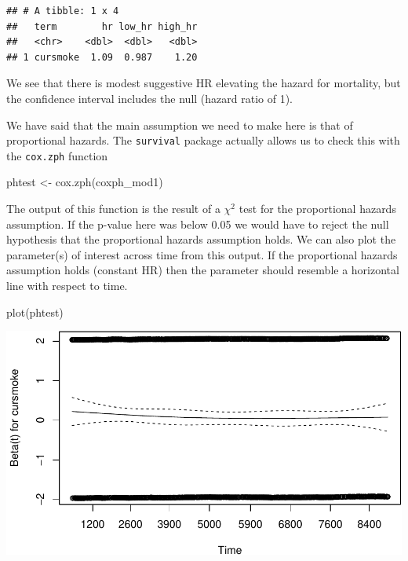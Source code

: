 \documentclass[
]{book}
\newenvironment{Shaded}{\begin{snugshade}}{\end{snugshade}}
\newcommand{\FunctionTok}[1]{\textcolor[rgb]{0.00,0.00,0.00}{#1}}
\newcommand{\NormalTok}[1]{#1}
\newcommand{\OtherTok}[1]{\textcolor[rgb]{0.56,0.35,0.01}{#1}}
\begin{document}
\begin{verbatim}
## # A tibble: 1 x 4
##   term        hr low_hr high_hr
##   <chr>    <dbl>  <dbl>   <dbl>
## 1 cursmoke  1.09  0.987    1.20
\end{verbatim}

We see that there is modest suggestive HR elevating the hazard for mortality, but the confidence interval includes the null (hazard ratio of 1).

We have said that the main assumption we need to make here is that of proportional hazards. The \texttt{survival} package actually allows us to check this with the \texttt{cox.zph} function

\begin{Shaded}
\begin{Highlighting}[]
\NormalTok{phtest }\OtherTok{\textless{}{-}} \FunctionTok{cox.zph}\NormalTok{(coxph\_mod1)}
\end{Highlighting}
\end{Shaded}

The output of this function is the result of a \(\chi^2\) test for the proportional hazards assumption. If the p-value here was below 0.05 we would have to reject the null hypothesis that the proportional hazards assumption holds.
We can also plot the parameter(s) of interest across time from this output. If the proportional hazards assumption holds (constant HR) then the parameter should resemble a horizontal line with respect to time.

\begin{Shaded}
\begin{Highlighting}[]
\FunctionTok{plot}\NormalTok{(phtest)}
\end{Highlighting}
\end{Shaded}

\includegraphics{adv_epi_analysis_files/figure-latex/unnamed-chunk-210-1.pdf}
\end{document}
